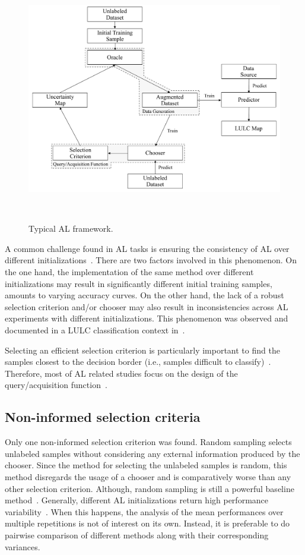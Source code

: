 \documentclass[parskip=full]{scrartcl}
\begin{document}
\begin{figure}[htb]
	\centering
	\includegraphics[width=.85\linewidth]{../analysis/al_typical}
	\caption{Typical AL framework.
    }~\label{fig:al_typical}
\end{figure}

A common challenge found in AL tasks is ensuring the consistency of AL over
different initializations~\cite{Kottke2017}. There are two factors involved in
this phenomenon. On the one hand, the implementation of the same method over
different initializations may result in significantly different initial training
samples, amounts to varying accuracy curves. On the other hand, the lack of a
robust selection criterion and/or chooser may also result in inconsistencies
across AL experiments with different initializations. This phenomenon was
observed and documented in a LULC classification context
in~\cite{tuia2011using}.

Selecting an efficient selection criterion is particularly important to find the
samples closest to the decision border (i.e., samples difficult to
classify)~\cite{Shrivastava2021}. Therefore, most of AL related studies focus on
the design of the query/acquisition function~\cite{Su2020}.

\subsection{Non-informed selection criteria}

Only one non-informed selection criterion was found. Random sampling selects
unlabeled samples without considering any external information produced by the
chooser. Since the method for selecting the unlabeled samples is random, this
method disregards the usage of a chooser and is comparatively worse than any
other selection criterion. Although, random sampling is still a powerful
baseline method~\cite{Cawley2011}. Generally, different AL initializations
return high performance variability~\cite{Kottke2017}. When this happens, the
analysis of the mean performances over multiple repetitions is not of interest
on its own. Instead, it is preferable to do pairwise comparison of different
methods along with their corresponding variances. 
\end{document}
